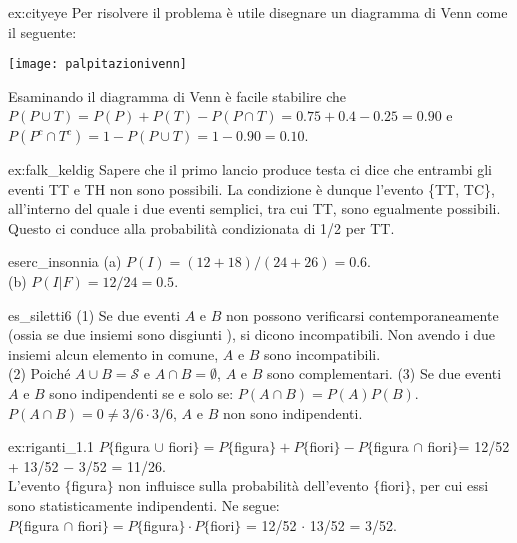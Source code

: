 \begin{sol}{ex:cityeye}
Per risolvere il problema è utile disegnare un diagramma di Venn come il seguente:
  \begin{center}
    \texttt{[image: palpitazionivenn]}
  \end{center}
 Esaminando il diagramma di Venn è facile stabilire che 
$P(P \cup T) = P(P) + P(T) - P(P\cap T) = 0.75 + 0.4 - 0.25 = 0.90$ e 
   $P(P^c \cap T^c) = 1 - P(P \cup T) = 1 - 0.90 = 0.10$.
\end{sol}


\begin{sol}{ex:falk_keldig}
Sapere che il primo lancio produce testa ci dice che entrambi gli eventi TT e TH non sono possibili. La condizione è dunque l'evento \{TT, TC\}, all'interno del quale i due eventi semplici, tra cui TT, sono egualmente possibili. Questo ci conduce alla probabilità condizionata di 1/2 per TT.
\end{sol}


\begin{sol}{eserc_insonnia}
(a) $P(I) = (12 + 18)/ (24 + 26) = 0.6$.\\
(b) $P(I|F) = 12/24 = 0.5$.
\end{sol}



\begin{sol}{es_siletti6}
(1) Se due eventi $A$ e $B$ non possono verificarsi contemporaneamente (ossia se due insiemi sono disgiunti ), si dicono incompatibili. Non avendo i due insiemi alcun elemento in comune, $A$ e $B$ sono incompatibili.  \\
(2) Poiché $A \cup B = \mathcal{S}$ e $A \cap B = \emptyset$, $A$ e $B$ sono complementari. (3)  Se due eventi $A$ e $B$ sono indipendenti se e solo se: $P(A \cap B) = P(A) P(B)$. $P(A \cap B) = 0 \neq 3/6 \cdot 3/6$, $A$ e $B$ non sono indipendenti.
\end{sol}



\begin{sol}{ex:riganti_1.1}
$P\{$figura $\cup$ fiori$\} = P\{$figura$\} + P\{$fiori$\} − P\{$figura $ \cap$ fiori$\}$= 12/52 + 13/52 − 3/52 = 11/26.\\
L'evento $\{$figura$\}$ non influisce sulla probabilità dell'evento $\{$fiori$\}$, per cui essi sono statisticamente indipendenti. Ne segue:\\
$P\{$figura $\cap$ fiori$\} = P\{$figura$\} \cdot P\{$fiori$\}$ = 12/52 $\cdot$ 13/52 = 3/52.
\end{sol}

